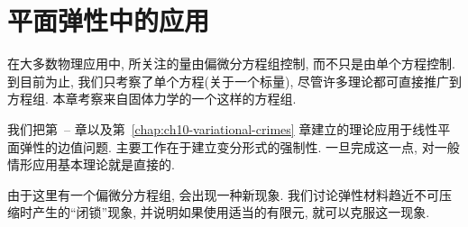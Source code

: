 \section{平面弹性中的应用}
\label{chap:ch11-planar-elasticity}
\newcommand{\chvec}[1]{\underset{\sim}{#1}}
\newcommand{\chten}[1]{\underset{\approx}{#1}}

在大多数物理应用中, 所关注的量由偏微分方程组控制, 而不只是由单个方程控制. 到目前为止, 我们只考察了单个方程(关于一个标量), 尽管许多理论都可直接推广到方程组. 本章考察来自固体力学的一个这样的方程组.

我们把第~-- 章以及第~\ref{chap:ch10-variational-crimes} 章建立的理论应用于线性平面弹性的边值问题. 主要工作在于建立变分形式的强制性. 一旦完成这一点, 对一般情形应用基本理论就是直接的.

由于这里有一个偏微分方程组, 会出现一种新现象. 我们讨论弹性材料趋近不可压缩时产生的``闭锁''现象, 并说明如果使用适当的有限元, 就可以克服这一现象.







